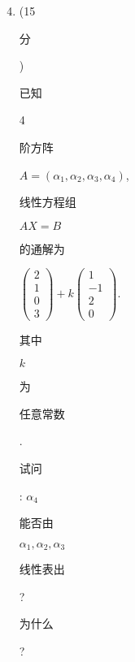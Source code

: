 \documentclass[10pt]{article}
\begin{document}
\begin{enumerate}
  \setcounter{enumi}{3}
  \item (15 \begin{CJK}{UTF8}{mj}分\end{CJK}) \begin{CJK}{UTF8}{mj}已知\end{CJK} 4 \begin{CJK}{UTF8}{mj}阶方阵\end{CJK} $A=\left(\alpha_{1}, \alpha_{2}, \alpha_{3}, \alpha_{4}\right)$, \begin{CJK}{UTF8}{mj}线性方程组\end{CJK} $A X=B$ \begin{CJK}{UTF8}{mj}的通解为\end{CJK} $\left(\begin{array}{c}2 \\ 1 \\ 0 \\ 3\end{array}\right)+k\left(\begin{array}{c}1 \\ -1 \\ 2 \\ 0\end{array}\right)$. \begin{CJK}{UTF8}{mj}其中\end{CJK} $k$ \begin{CJK}{UTF8}{mj}为\end{CJK} \begin{CJK}{UTF8}{mj}任意常数\end{CJK}. \begin{CJK}{UTF8}{mj}试问\end{CJK}: $\alpha_{4}$ \begin{CJK}{UTF8}{mj}能否由\end{CJK} $\alpha_{1}, \alpha_{2}, \alpha_{3}$ \begin{CJK}{UTF8}{mj}线性表出\end{CJK}? \begin{CJK}{UTF8}{mj}为什么\end{CJK}?


\end{enumerate}
\end{document}
